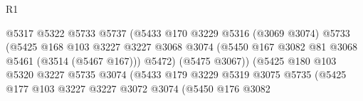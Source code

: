 \begin{lexlean}{R1}
\begin{coremodule}
                                            @5317
                                            @5322
                                            @5733
                                            @5737
                                            (@5433
                                              @170
                                              @3229
                                              @5316
                                              (@3069 @3074)
                                              @5733
                                              (@5425
                                                @168
                                                @103
                                                @3227
                                                @3227
                                                @3068
                                                @3074
                                                (@5450
                                                  @167
                                                  @3082
                                                  @81
                                                  @3068
                                                  @5461
                                                  (@3514 (@5467 @167)))
                                                @5472)
                                              (@5475 @3067))
                                            (@5425
                                              @180
                                              @103
                                              @5320
                                              @3227
                                              @5735
                                              @3074
                                              (@5433
                                                @179
                                                @3229
                                                @5319
                                                @3075
                                                @5735
                                                (@5425
                                                  @177
                                                  @103
                                                  @3227
                                                  @3227
                                                  @3072
                                                  @3074
                                                  (@5450
                                                    @176
                                                    @3082

\end{coremodule}
\end{lexlean}
